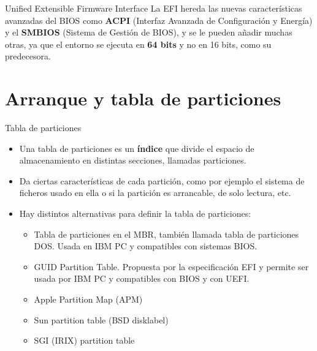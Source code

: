\begin{frame}[c]{Unified Extensible Firmware Interface}
  La EFI hereda las nuevas características avanzadas del BIOS como
  \textbf{ACPI} (Interfaz Avanzada de Configuración y Energía) y el
  \textbf{SMBIOS} (Sistema de Gestión de BIOS), y se le pueden añadir
  muchas otras, ya que el entorno se ejecuta en \textbf{64 bits} y no en
  16 bits, como su predecesora.
\end{frame}

\section{Arranque y tabla de particiones}

\begin{frame}[c]{Tabla de particiones}
  \begin{itemize}
    \item Una tabla de particiones es un \textbf{índice} que divide el
      espacio de almacenamiento en distintas secciones, llamadas
      particiones.
    \pausa
    \item Da ciertas características de cada partición, como por ejemplo
      el sistema de ficheros usado en ella o si la partición es arrancable,
      de solo lectura, etc.
    \pausa
    \item Hay distintos alternativas para definir la tabla de particiones:
      \pausa
      \begin{itemize}
        \item Tabla de particiones en el MBR, también llamada tabla de
          particiones DOS. Usada en IBM PC y compatibles con sistemas BIOS.
        \pausa
        \item GUID Partition Table. Propuesta por la especificación EFI y
          permite ser usada por IBM PC y compatibles con BIOS y con UEFI.
        \pausa
        \item Apple Partition Map (APM)
        \item Sun partition table (BSD disklabel)
        \item SGI (IRIX) partition table
      \end{itemize}
  \end{itemize}
\end{frame}


